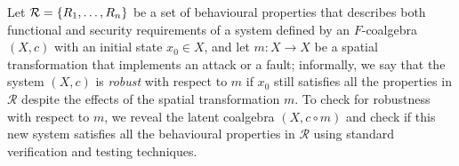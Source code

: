 Let $\mathcal{R}=\left\{R_1, \ldots, R_n\right\}$ be a set of behavioural properties that describes both functional and security requirements of a system defined by an $F$-coalgebra $(X,c)$ with an initial state $x_0\in X$, and let %
$m\colon X\rightarrow X$ be a spatial transformation that implements an attack or a fault; informally, %
we say that the system $(X,c)$ is \emph{robust} with respect to $m$ if $x_0$ still satisfies all the properties in $\mathcal{R}$ despite the effects of the spatial transformation $m$. To check for robustness with respect to $m$, we 
reveal the latent coalgebra $(X, c\circ m)$ and check if this new system satisfies all the behavioural properties in $\mathcal{R}$ using standard verification and  testing techniques. 
